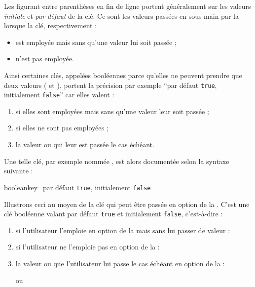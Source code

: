 Les  figurant entre parenthèses en fin de ligne portent
généralement sur les valeurs \emph{initiale} et \emph{par défaut} de la clé. Ce
sont les valeurs passées en sous-main par la \yatcl{} lorsque la clé,
respectivement :
\begin{itemize}
\item est employée mais sans qu'une valeur lui soit passée ;
\item n'est pas employée.
\end{itemize}
Ainsi certaines clés, appelées booléennes parce qu'elles ne peuvent prendre que
deux valeurs ( et ), portent la précision par
exemple \enquote{par défaut \lstinline|true|, initialement \lstinline|false|}
car elles valent :
\begin{enumerate}
\item {} si elles sont employées mais sans qu'une valeur leur
  soit passée ;
\item {} si elles ne sont pas employées ;
\item la valeur  ou  qui leur est passée le
  cas échéant.
\end{enumerate}
Une telle clé, par exemple nommée , est alors documentée selon la
syntaxe suivante :
\begin{docKey*}{booleankey}{=\textbar{}}{par
    défaut \lstinline|true|, initialement \lstinline|false|}
\end{docKey*}

Illustrons ceci au moyen de la clé  qui peut être passée en
option de la \yatcl. C'est une clé booléenne valant par défaut \lstinline|true|
et initialement \lstinline|false|, c'est-à-dire :
\begin{enumerate}
\item {} si l'utilisateur l'emploie en option de la \yatcl mais
  sans lui passer de valeur :
\item {} si l'utilisateur ne l'emploie pas en option de la \yatcl :
\item la valeur  ou  que l'utilisateur lui
  passe le cas échéant en option de la \yatcl :
ou
\end{enumerate}

